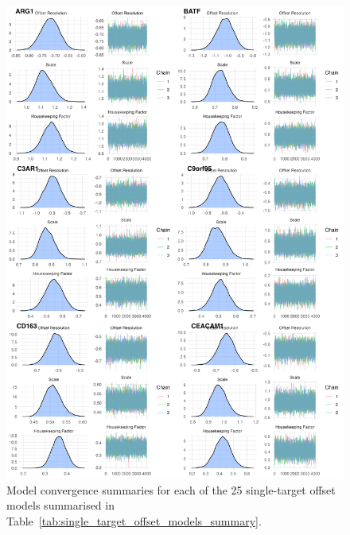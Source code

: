 \documentclass[../thesis.tex]{subfiles}
\begin{document}
\begin{figure}[!hb]
    \centering
    \includegraphics[width=\textwidth]{figures/chapter2/model_summaries_1.png}
    \caption{Model convergence summaries for each of the 25 single-target offset models summarised in Table~\ref{tab:single_target_offset_models_summary}.}
    \label{fig:convergence_1}
\end{figure}
\end{document}
